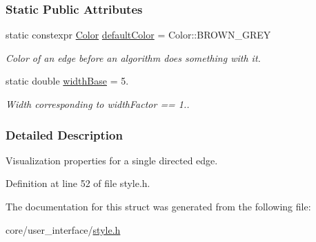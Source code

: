 \subsubsection*{Static Public Attributes}
\begin{DoxyCompactItemize}
\item 
static constexpr \hyperlink{namespaceslb_1_1core_1_1util_afae144e1a65658559242f5cf4fce426f}{Color} \hyperlink{structslb_1_1core_1_1ui_1_1EdgeStyle_a11590a49462e609a2fa986453f229fb7}{default\+Color} = Color\+::\+B\+R\+O\+W\+N\+\_\+\+G\+R\+EY\hypertarget{structslb_1_1core_1_1ui_1_1EdgeStyle_a11590a49462e609a2fa986453f229fb7}{}\label{structslb_1_1core_1_1ui_1_1EdgeStyle_a11590a49462e609a2fa986453f229fb7}

\begin{DoxyCompactList}\small\item\em Color of an edge before an algorithm does something with it. \end{DoxyCompactList}\item 
static double \hyperlink{structslb_1_1core_1_1ui_1_1EdgeStyle_ad373481f2c46d147fd3658d5f217e2cf}{width\+Base} = 5.\hypertarget{structslb_1_1core_1_1ui_1_1EdgeStyle_ad373481f2c46d147fd3658d5f217e2cf}{}\label{structslb_1_1core_1_1ui_1_1EdgeStyle_ad373481f2c46d147fd3658d5f217e2cf}

\begin{DoxyCompactList}\small\item\em Width corresponding to width\+Factor == 1.. \end{DoxyCompactList}\end{DoxyCompactItemize}


\subsubsection{Detailed Description}
Visualization properties for a single directed edge. 

Definition at line 52 of file style.\+h.



The documentation for this struct was generated from the following file\+:\begin{DoxyCompactItemize}
\item 
core/user\+\_\+interface/\hyperlink{style_8h}{style.\+h}\end{DoxyCompactItemize}

